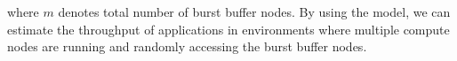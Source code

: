 where $m$ denotes total number of burst buffer nodes. 
By using the model, we can estimate the throughput of applications in
environments where multiple compute nodes are running and randomly accessing the
burst buffer nodes.

\begin{comment}
\subsection{Modeling of Cost}
In addition to I/O throughput of the cloud-based burst buffers, another
important aspect is the cost.
While I/O throughput can be accelerated by burst buffers, the cost can be
increased because of additional nodes for burst buffers.
To estimate the cost, we also model the cost of the cloud-based burst buffers.

When we run an application using $\acute{n}$ number of compute nodes in a
environment where $b$ number of burst buffers are used, the cost is charged for
the compute node, and burst buffer nodes.
Thus, the total cost, $C_{total}$ can be computed as:   If a \emph{target}
compute node
\begin{equation}
C_{total} = \{　\acute{n} \times \text{C}_{cn}+ (b \times \text{C}_{bn} \times
 + 1 \times C_{mn}) \times \frac{\acute{n}}{n} \}\times etime
\end{equation}

where $C_{cn}$, $C_{bn}$ and $C_{mn}$ denote costs per second (${\it \$} /sec$)
of a compute node, a burst buffer node, and a metadata server node
respectively, $etime$ denotes the execution time of the application. If we
use the same instances for there nodes, the cost becomes 
$C_{cn}=C_{bn}=C_{mn}$.
For the fairness of the cost, the cost for burst buffers is charged depending on the number of compute nodes used by the application in this model. By using this
model, we estimate the overall cost of an application run. 
\end{comment}


